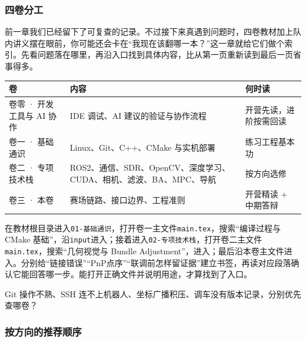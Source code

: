 \subsubsection{四卷分工}

前一章我们已经留下了可复查的记录。不过接下来真遇到问题时，四卷教材加上队内讲义摆在眼前，你可能还会卡在“我现在该翻哪一本？”这一章就给它们做个索引。先看问题落在哪里，再沿入口找到具体内容，比从第一页重新读到最后一页省事得多。

\begin{center}
\begin{tabular}{@{}>{\raggedright\arraybackslash}p{}>{\raggedright\arraybackslash}p{}>{\raggedright\arraybackslash}p{}@{}}
\toprule[1.5pt]
卷 & 内容 & 何时读 \\
\midrule[1pt]
卷零 · 开发工具与 AI 协作 & IDE 调试、AI 建议的验证与协作流程 & 开营先读，进阶按需回读 \\
卷一 · 基础通识 & Linux、Git、C++、CMake 与实机部署 & 练习工程基本功 \\
卷二 · 专项技术栈 & ROS2、通信、SDR、OpenCV、深度学习、CUDA、相机、滤波、BA、MPC、导航 & 按方向选修 \\
卷三 · 本卷 & 赛场链路、接口边界、工程准则 & 开营精读 + 中期答辩 \\
\bottomrule[1.5pt]
\end{tabular}
\end{center}

\begin{example}[把问题放回正确卷册]
在教材根目录进入\texttt{01-基础通识}，打开卷一主文件\texttt{main.tex}，搜索“编译过程与 CMake 基础”，沿\texttt{input}进入；接着进入\texttt{02-专项技术栈}，打开卷二主文件\texttt{main.tex}，搜索“几何视觉与 Bundle Adjustment”，进入；最后沿本卷主文件进入。分别给“链接错误”“PnP点序”“联调前怎样留证据”建立书签，再读对应段落确认它能回答哪一步。能打开正确文件并说明用途，才算找到了入口。
\end{example}

\begin{exercise}
\label{v3-ex-index-1}
Git 操作不熟、SSH 连不上机器人、坐标广播积压、调车没有版本记录，分别优先查哪卷？
\end{exercise}

\subsubsection{按方向的推荐顺序}

